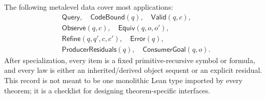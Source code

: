 The following metalevel data cover most applications:
\begin{align*}
 &\mathsf{Query},\quad \mathsf{CodeBound}(q),\quad \mathsf{Valid}(q,c),\\
 &\mathsf{Observe}(q,c),\quad \mathsf{Equiv}(q,o,o'),\\
 &\mathsf{Refine}(q,q',c,c'),\quad \mathsf{Error}(q),\\
 &\mathsf{ProducerResiduals}(q),\quad \mathsf{ConsumerGoal}(q,o).
\end{align*}
After specialization, every item is a fixed primitive-recursive symbol or formula, and every law is either an inherited/derived object sequent or an explicit residual.  This record is not meant to be one monolithic Lean type imported by every theorem; it is a checklist for designing theorem-specific interfaces.
